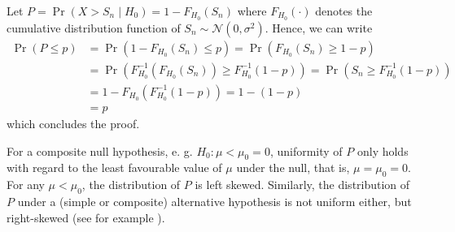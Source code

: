 Let ${P = \Pr(X > S_n \mid H_0) = 1-F_{H_0}(S_n)}$ where $F_{H_0}(\cdot)$ denotes the cumulative distribution function of ${S_n \sim \mathcal{N}(0,\sigma^2)}$. Hence, we can write
\begin{align*}
    \Pr(P \leq p) &= \Pr(1-F_{H_0}(S_n) \leq p) = \Pr(F_{H_0}(S_n) \geq 1-p)\\ &=
    \Pr(F_{H_0}^{-1}(F_{H_0}(S_n)) \geq F_{H_0}^{-1}(1-p)) = \Pr(S_n \geq F_{H_0}^{-1}(1-p)) \\
    &= 1-F_{H_0}(F_{H_0}^{-1}(1-p)) = 1-(1-p) \\ 
    &= p
\end{align*}
which concludes the proof.\par
For a composite null hypothesis, e. g. $H_0: \mu < \mu_0 = 0$, uniformity of $P$ only holds with regard to the least favourable value of $\mu$ under the null, that is, $\mu = \mu_0 = 0$. For any $\mu < \mu_0$, the distribution of $P$ is left skewed. Similarly, the distribution of $P$ under a (simple or composite) alternative hypothesis is not uniform either, but right-skewed (see for example \citet{murdoch_values_2008}).

